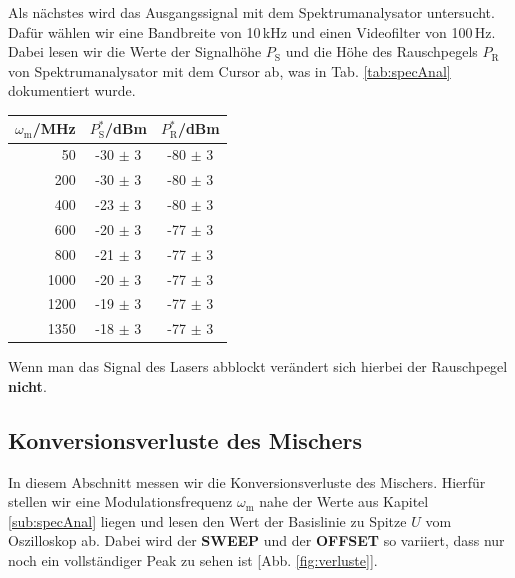 Als nächstes wird das Ausgangssignal mit dem Spektrumanalysator untersucht. Dafür wählen wir eine Bandbreite von 10\,kHz und einen Videofilter von 100\,Hz. Dabei lesen wir die Werte der Signalhöhe $P_\mathrm{S}$ und die Höhe des Rauschpegels $P_\mathrm{R}$ von Spektrumanalysator mit dem Cursor ab, was in Tab. \ref{tab:specAnal} dokumentiert wurde.
\begin{center}
    \captionsetup{type=table}
    \begin{tabular}{r | c c}
        $\omega_\mathrm{m}$/MHz & $P^*_\mathrm{S}$/dBm & $P^*_\mathrm{R}$/dBm \\ \hline
        50   & -30 $\pm$ 3 & -80 $\pm$ 3 \\
        200  & -30 $\pm$ 3 & -80 $\pm$ 3 \\
        400  & -23 $\pm$ 3 & -80 $\pm$ 3 \\
        600  & -20 $\pm$ 3 & -77 $\pm$ 3 \\
        800  & -21 $\pm$ 3 & -77 $\pm$ 3 \\
        1000 & -20 $\pm$ 3 & -77 $\pm$ 3 \\
        1200 & -19 $\pm$ 3 & -77 $\pm$ 3 \\
        1350 & -18 $\pm$ 3 & -77 $\pm$ 3 \\
    \end{tabular}
    \label{tab:specAnal}
\end{center}
Wenn man das Signal des Lasers abblockt verändert sich hierbei der Rauschpegel \textbf{nicht}.

\newpage

\subsection{Konversionsverluste des Mischers}
\label{sub:verluste}

In diesem Abschnitt messen wir die Konversionsverluste des Mischers. Hierfür stellen wir eine Modulationsfrequenz $\omega_\mathrm{m}$ nahe der Werte aus Kapitel \ref{sub:specAnal} liegen und lesen den Wert der Basislinie zu Spitze $U$ vom Oszilloskop ab. Dabei wird der \textbf{SWEEP} und der \textbf{OFFSET} so variiert, dass nur noch ein vollständiger Peak zu sehen ist [Abb. \ref{fig:verluste}].

